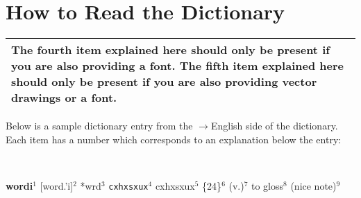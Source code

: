 
\chapter{How to Read the Dictionary}

\begin{center}
\begin{tabular}{|p{}|}\hline
The fourth item explained here should only be present if you are also providing a font.
The fifth item explained here should only be present if you are also providing vector drawings or a font.
\\\hline
\end{tabular}
\end{center}

Below is a sample dictionary entry from the \LanguageName$\rightarrow$English side of the dictionary.
Each item has a number which corresponds to an explanation below the entry:

{\ }

\noindent
\textbf{wordi}$^1$
[word.'i]$^2$
*wrd$^3$
\texttt{cxhxsxux}$^4$
{\confont cxhxsxux}$^5$
\{24\}$^6$
(v.)$^7$
to gloss$^8$
(nice note)$^9$

